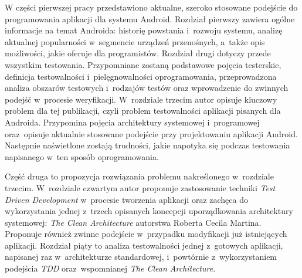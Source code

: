 W części pierwszej pracy przedstawiono aktualne, szeroko stosowane podejście do programowania aplikacji dla systemu Android. Rozdział pierwszy zawiera ogólne informacje na temat Androida: historię powstania i~rozwoju systemu, analizę aktualnej popularności w~segmencie urządzeń przenośnych, a~także opis możliwości, jakie oferuje dla programistów. Rozdział drugi dotyczy przede wszystkim testowania. Przypomniane zostaną podstawowe pojęcia testerskie, definicja testowalności i~pielęgnowalności oprogramowania, przeprowadzona analiza obszarów testowych i~rodzajów testów oraz wprowadzenie do zwinnych podejść w~procesie weryfikacji. W~rozdziale trzecim autor opisuje kluczowy problem dla tej publikacji, czyli problem testowalności aplikacji pisanych dla Androida. Przypomina pojęcia architektury systemowej i~programowej oraz~opisuje aktualnie stosowane podejście przy projektowaniu aplikacji Android. Następnie naświetlone zostają trudności, jakie napotyka się podczas testowania napisanego w~ten sposób oprogramowania.

Część druga to propozycja rozwiązania problemu nakreślonego w~rozdziale trzecim. W~rozdziale czwartym autor proponuje zastosowanie techniki \textit{Test Driven Development} w~procesie tworzenia aplikacji oraz zachęca do wykorzystania jednej z~trzech opisanych koncepcji uporządkowania architektury systemowej: \textit{The Clean Architecture} autorstwa Roberta Cecila Martina. Proponuje również zwinne podejście w~przypadku modyfikacji już istniejących aplikacji. Rozdział piąty to analiza testowalności jednej z~gotowych aplikacji, napisanej raz w~architekturze standardowej, i~powtórnie z~wykorzystaniem podejścia \textit{TDD} oraz~wspomnianej \textit{The Clean Architecture}.



